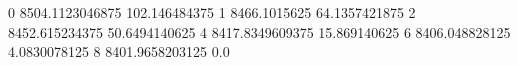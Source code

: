 0 8504.1123046875 102.146484375
1 8466.1015625 64.1357421875
2 8452.615234375 50.6494140625
4 8417.8349609375 15.869140625
6 8406.048828125 4.0830078125
8 8401.9658203125 0.0
